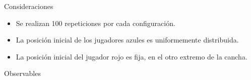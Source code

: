 
\begin{frame}{Consideraciones}
    \begin{itemize}
        \item Se realizan 100 repeticiones por cada configuración.
        \item La posición inicial de los jugadores azules es uniformemente distribuida.
        \item La posición inicial del jugador rojo es fija, en el otro extremo de la cancha.
    \end{itemize}
\end{frame}

\begin{frame}{Observables}

\end{frame}